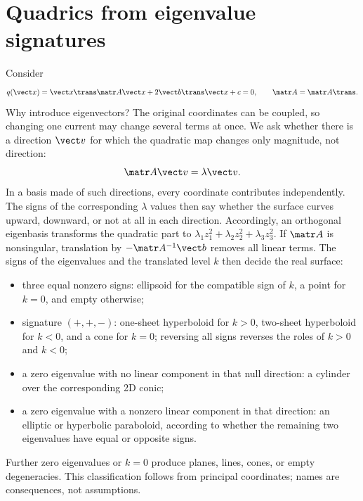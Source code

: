 \section{Quadrics from eigenvalue signatures}

Consider
\begin{equation}
 q(\state)=\state\trans\matr A\state+2\vect b\trans\state+c=0,
 \qquad \matr A=\matr A\trans.\label{eq:general-quadric}
\end{equation}
Why introduce eigenvectors?  The original coordinates can be coupled, so
changing one current may change several terms at once.  We ask whether there
is a direction $\vect v$ for which the quadratic map changes only magnitude,
not direction:
\begin{equation}
 \matr A\vect v=\lambda\vect v.
\end{equation}
In a basis made of such directions, every coordinate contributes
independently.  The signs of the corresponding $\lambda$ values then say
whether the surface curves upward, downward, or not at all in each direction.
Accordingly, an orthogonal eigenbasis transforms the quadratic part to
$\lambda_1z_1^2+\lambda_2z_2^2+\lambda_3z_3^2$.  If $\matr A$ is nonsingular,
translation by $-\matr A^{-1}\vect b$ removes all linear terms.  The signs of
the eigenvalues and the translated level $k$ then decide the real surface:
\begin{itemize}
 \item three equal nonzero signs: ellipsoid for the compatible sign of $k$,
       a point for $k=0$, and empty otherwise;
 \item signature $(+,+,-)$: one-sheet hyperboloid for $k>0$, two-sheet
       hyperboloid for $k<0$, and a cone for $k=0$; reversing all signs reverses
       the roles of $k>0$ and $k<0$;
 \item a zero eigenvalue with no linear component in that null direction:
       a cylinder over the corresponding 2D conic;
 \item a zero eigenvalue with a nonzero linear component in that direction:
       an elliptic or hyperbolic paraboloid, according to whether the remaining
       two eigenvalues have equal or opposite signs.
\end{itemize}
Further zero eigenvalues or $k=0$ produce planes, lines, cones, or empty
degeneracies.  This classification follows from principal coordinates; names
are consequences, not assumptions.

